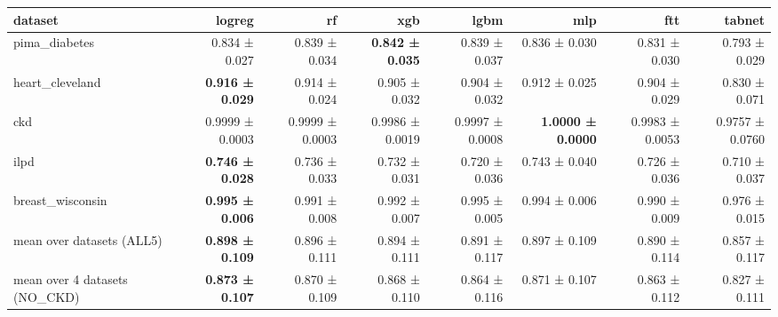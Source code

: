 \begin{tabular}{lrrrrrrr}
\toprule
dataset & logreg & rf & xgb & lgbm & mlp & ftt & tabnet \\
\midrule
pima\_diabetes & 0.834 ± 0.027 & 0.839 ± 0.034 & \textbf{0.842 ± 0.035} & 0.839 ± 0.037 & 0.836 ± 0.030 & 0.831 ± 0.030 & 0.793 ± 0.029 \\
heart\_cleveland & \textbf{0.916 ± 0.029} & 0.914 ± 0.024 & 0.905 ± 0.032 & 0.904 ± 0.032 & 0.912 ± 0.025 & 0.904 ± 0.029 & 0.830 ± 0.071 \\
ckd & 0.9999 ± 0.0003 & 0.9999 ± 0.0003 & 0.9986 ± 0.0019 & 0.9997 ± 0.0008 & \textbf{1.0000 ± 0.0000} & 0.9983 ± 0.0053 & 0.9757 ± 0.0760 \\
ilpd & \textbf{0.746 ± 0.028} & 0.736 ± 0.033 & 0.732 ± 0.031 & 0.720 ± 0.036 & 0.743 ± 0.040 & 0.726 ± 0.036 & 0.710 ± 0.037 \\
breast\_wisconsin & \textbf{0.995 ± 0.006} & 0.991 ± 0.008 & 0.992 ± 0.007 & 0.995 ± 0.005 & 0.994 ± 0.006 & 0.990 ± 0.009 & 0.976 ± 0.015 \\
mean over datasets (ALL5) & \textbf{0.898 ± 0.109} & 0.896 ± 0.111 & 0.894 ± 0.111 & 0.891 ± 0.117 & 0.897 ± 0.109 & 0.890 ± 0.114 & 0.857 ± 0.117 \\
mean over 4 datasets (NO\_CKD) & \textbf{0.873 ± 0.107} & 0.870 ± 0.109 & 0.868 ± 0.110 & 0.864 ± 0.116 & 0.871 ± 0.107 & 0.863 ± 0.112 & 0.827 ± 0.111 \\
\bottomrule
\end{tabular}
